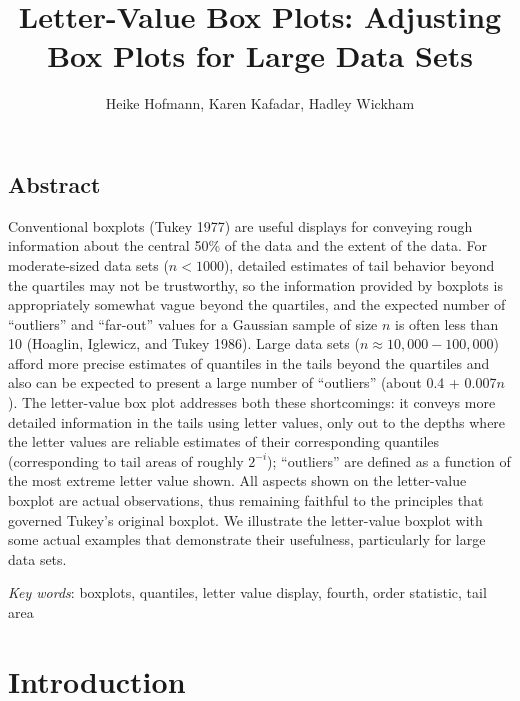 \documentclass[11pt]{article}
\title{Letter-Value Box Plots: 
Adjusting Box Plots for Large Data Sets}
\author{Heike Hofmann, Karen Kafadar, Hadley Wickham}
\begin{document}
\maketitle

\subsection*{Abstract}

Conventional boxplots (Tukey 1977) are useful
displays for conveying rough information about the
central 50\% of the data and the extent of the data.
For moderate-sized data sets ($n < 1000$), detailed 
estimates of tail behavior beyond the quartiles may 
not be trustworthy, so the information provided by 
boxplots is appropriately somewhat vague beyond 
the quartiles,
and the expected number of ``outliers'' and ``far-out'' 
values for a Gaussian sample of size $n$ is often
less than 10 (Hoaglin, Iglewicz, and Tukey 1986).
Large data sets ($n \approx 10,000-100,000$)
afford more precise estimates of quantiles in the
tails beyond the quartiles and also can be expected
to present a large number of ``outliers'' (about
0.4 + 0.007$n$).  The letter-value box plot addresses
both these shortcomings:  it conveys more detailed 
information in the tails using letter values, only
out to the depths where the letter values are reliable
estimates of their corresponding quantiles 
(corresponding to tail areas of roughly $2^{-i}$);
``outliers'' are defined as a function of the most extreme
letter value shown.  All aspects shown on the
letter-value boxplot are actual observations, thus
remaining faithful to the principles that governed
Tukey's original boxplot.  We illustrate the 
letter-value boxplot with some actual examples that
demonstrate their usefulness, particularly for
large data sets.

\textit{Key words}: boxplots, quantiles, letter value display, 
fourth, order statistic, tail area

\section{Introduction}
\end{document}
